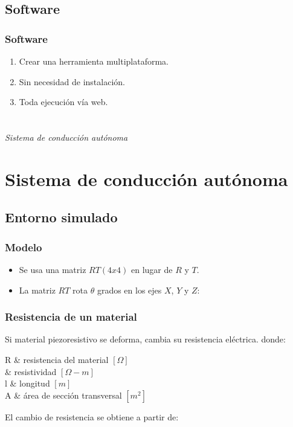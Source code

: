 \documentclass{beamer}
\makeatletter
\newenvironment{conditions*} %
	{\par\vspace{\abovedisplayskip}\noindent
	 \tabularx{\columnwidth}{>{$}l<{$} @{\ : } >{\raggedright\arraybackslash}X}}
	{\endtabularx\par\vspace{\belowdisplayskip}}
\makeatother
\begin{document}
\subsection{Software}
\begin{frame}
	\frametitle{Software}
	\begin{enumerate}
	\item Crear una herramienta multiplataforma.
	\item Sin necesidad de instalación.
	\item Toda ejecución vía web.
	\end{enumerate}
\end{frame}


\section*{}
\begin{frame}{}
	\centering \Huge
	\emph{Sistema de conducción autónoma}
\end{frame}

\section{Sistema de conducción autónoma}
\subsection{Entorno simulado}
\begin{frame}
	\frametitle{Modelo}
	\begin{itemize}
	\item Se usa una matriz $RT (4x4)$ en lugar de $R$ y $T$.
	\item La matriz $RT$ rota $\theta$ grados en los ejes $X$, $Y$ y $Z$:
	\end{itemize}
\end{frame}

\begin{frame}
	\frametitle{Resistencia de un material}
	\begin{outline}
	\1 Si material piezoresistivo se deforma, cambia su resistencia eléctrica.
	donde:
	\begin{conditions*}
	R & resistencia del material $[\Omega]$\\
	\rho & resistividad $[\Omega-m]$\\
	l & longitud $[m]$\\
	A & área de sección transversal $[m^2]$
	\end{conditions*}
	\1 El cambio de resistencia se obtiene a partir de:
	\end{outline}
\end{frame}
\end{document}
